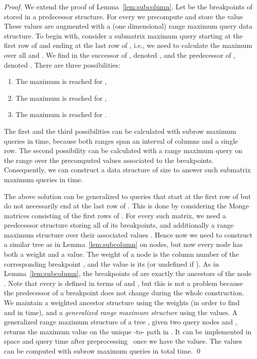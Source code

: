 \documentclass{llncs}
\begin{document}
\begin{proof}
We extend the proof of Lemma~\ref{lem:subcolumn}.  Let 
be the breakpoints of  stored in a predecessor structure. For every 
we precompute and store the value  
These values are
augmented with a (one dimensional) range maximum query data structure. 
To begin with, consider a submatrix maximum query starting at the first row of  and ending
at the last row of , i.e., we need to calculate the maximum  over all  and . 
We find in  the successor of , denoted , and the predecessor of , denoted
. There are  three possibilities:
\begin{enumerate}
\item The maximum is reached for ,
\item The maximum is reached for ,
\item The maximum is reached for .
\end{enumerate}
The first and the third possibilities can be calculated with subrow maximum queries in  time, because
both ranges span an interval of columns and a single row.
The second possibility can be calculated with a range maximum query on the range  over
the precomputed values  associated to the breakpoints.
Consequently, we can construct a data structure of size  to answer such submatrix
maximum queries in  time.

The above solution can be generalized to queries that start at the first row of  but do not necessarily end at the last row of . This is done
by considering the Monge matrices  consisting
of the first  rows of . For every such matrix, we need a predecessor structure
storing all of its breakpoints, and additionally a range maximum structure over
their associated values . Hence now we need to construct a similar
tree  as in Lemma~\ref{lem:subcolumn} on  nodes,
but now every node has both a weight and a value. The weight of a node is the column number
of the corresponding breakpoint , and the value is its  (or undefined if ).
As in Lemma~\ref{lem:subcolumn}, the breakpoints of  are exactly the ancestors of the node . Note that
every  is defined in terms of  and , but this is not a problem because
the predecessor of a breakpoint does not change during the whole construction.
We maintain a weighted ancestor structure
using the weights (in order to find  and  in  time), and a {\em generalized range maximum structure} using the values. A generalized range maximum structure of a tree , given two query nodes  and , returns the maximum value on the unique -to-
path in . It can be implemented
in  space and  query time after  preprocessing~\cite{DemaineLandauWeimann}
once we have the values. The values can be computed with subrow maximum queries
in  total time.
\qed \end{proof}
\end{document}
